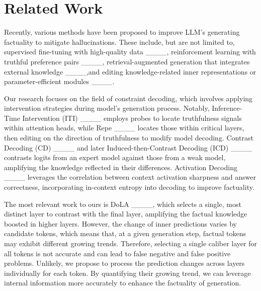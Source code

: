 \section{Related Work}
Recently, various methods have been proposed to improve LLM's generating factuality to mitigate hallucinations. These include, but are not limited to, supervised fine-tuning with high-quality data ____, reinforcement learning with truthful preference pairs ____, retrieval-augmented generation that integrates external knowledge ____,and editing knowledge-related inner representations or parameter-efficient modules ____.


Our research focuses on the field of constraint decoding, which involves applying intervention strategies during model's generation process.
Notably, Inference-Time Intervention (ITI) ____ employs probes to locate truthfulness signals within attention heads, while Repe ____ locates those within critical layers, then editing on the direction of truthfulness to modify model decoding.
Contrast Decoding (CD) ____ and later Induced-then-Contrast Decoding (ICD) ____ contrasts logits from an expert model against those from a weak model, amplifying the knowledge reflected in their differences.
Activation Decoding ____ leverages the correlation between context activation sharpness and answer correctness,
incorporating in-context entropy into decoding to improve factuality.


The most relevant work to ours is  DoLA ____, which selects a single, most distinct layer to contrast with the final layer, amplifying the factual knowledge boosted in higher layers.
However, the change of inner predictions varies by candidate tokens, which means that, at a given generation step, factual tokens may exhibit different growing trends. Therefore, selecting a single caliber layer for all tokens is not accurate and can lead to false negative and false positive problems. 
Unlikely, we propose to process the prediction changes across layers individually for each token. By quantifying their growing trend, we can leverage internal information more accurately to enhance the factuality of generation.


